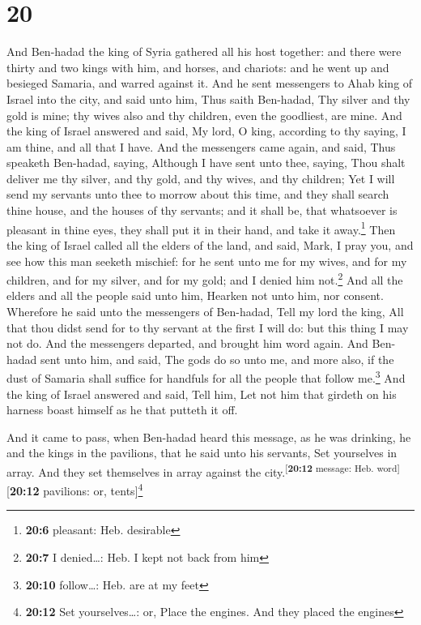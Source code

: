 \hypertarget{section-19}{%
\section{20}\label{section-19}}

 And Ben-hadad the king of Syria gathered all his host
together: and there were thirty and two kings with him, and horses, and
chariots: and he went up and besieged Samaria, and warred against it.
 And he sent messengers to Ahab king of Israel into the
city, and said unto him, Thus saith Ben-hadad,  Thy silver
and thy gold is mine; thy wives also and thy children, even the
goodliest, are mine.  And the king of Israel answered and
said, My lord, O king, according to thy saying, I am thine, and all that
I have.  And the messengers came again, and said, Thus
speaketh Ben-hadad, saying, Although I have sent unto thee, saying, Thou
shalt deliver me thy silver, and thy gold, and thy wives, and thy
children;  Yet I will send my servants unto thee to morrow
about this time, and they shall search thine house, and the houses of
thy servants; and it shall be, that whatsoever is pleasant in thine
eyes, they shall put it in their hand, and take it away.\footnote{\textbf{20:6}
  pleasant: Heb. desirable}  Then the king of Israel
called all the elders of the land, and said, Mark, I pray you, and see
how this man seeketh mischief: for he sent unto me for my wives, and for
my children, and for my silver, and for my gold; and I denied him
not.\footnote{\textbf{20:7} I denied\ldots: Heb. I kept not back from
  him}  And all the elders and all the people said unto
him, Hearken not unto him, nor consent.  Wherefore he said
unto the messengers of Ben-hadad, Tell my lord the king, All that thou
didst send for to thy servant at the first I will do: but this thing I
may not do. And the messengers departed, and brought him word again.
 And Ben-hadad sent unto him, and said, The gods do so
unto me, and more also, if the dust of Samaria shall suffice for
handfuls for all the people that follow me.\footnote{\textbf{20:10}
  follow\ldots: Heb. are at my feet}  And the king of
Israel answered and said, Tell him, Let not him that girdeth on his
harness boast himself as he that putteth it off.

 And it came to pass, when Ben-hadad heard this message,
as he was drinking, he and the kings in the pavilions, that he said unto
his servants, Set yourselves in array. And they set themselves in array
against the city.\textsuperscript{{[}\textbf{20:12} message: Heb.
word{]}}{[}\textbf{20:12} pavilions: or, tents{]}\footnote{\textbf{20:12}
  Set yourselves\ldots: or, Place the engines. And they placed the
  engines}

